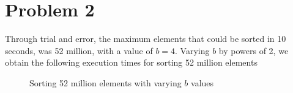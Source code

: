\documentclass{article}
\begin{document}
\section*{Problem 2}

Through trial and error, the maximum elements that could be sorted in 10 seconds, was 52 million, with a value of \( b = 4 \). Varying \( b \) by powers of 2, we obtain the following execution times for sorting 52 million elements



\begin{figure}[H]
    \begin{center}
    \end{center}
    \caption{Sorting 52 million elements with varying \( b \) values}
\end{figure}

\end{document}
